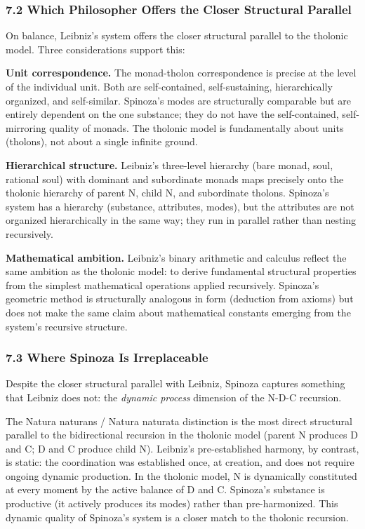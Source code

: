 \documentclass[
  11pt,
  letterpaper,
]{article}
\begin{document}
\subsubsection{7.2 Which Philosopher Offers the Closer Structural
Parallel}\label{which-philosopher-offers-the-closer-structural-parallel}

On balance, Leibniz's system offers the closer structural parallel to
the tholonic model. Three considerations support this:

\textbf{Unit correspondence.} The monad-tholon correspondence is precise
at the level of the individual unit. Both are self-contained,
self-sustaining, hierarchically organized, and self-similar. Spinoza's
modes are structurally comparable but are entirely dependent on the one
substance; they do not have the self-contained, self-mirroring quality
of monads. The tholonic model is fundamentally about units (tholons),
not about a single infinite ground.

\textbf{Hierarchical structure.} Leibniz's three-level hierarchy (bare
monad, soul, rational soul) with dominant and subordinate monads maps
precisely onto the tholonic hierarchy of parent N, child N, and
subordinate tholons. Spinoza's system has a hierarchy (substance,
attributes, modes), but the attributes are not organized hierarchically
in the same way; they run in parallel rather than nesting recursively.

\textbf{Mathematical ambition.} Leibniz's binary arithmetic and calculus
reflect the same ambition as the tholonic model: to derive fundamental
structural properties from the simplest mathematical operations applied
recursively. Spinoza's geometric method is structurally analogous in
form (deduction from axioms) but does not make the same claim about
mathematical constants emerging from the system's recursive structure.

\subsubsection{7.3 Where Spinoza Is
Irreplaceable}\label{where-spinoza-is-irreplaceable}

Despite the closer structural parallel with Leibniz, Spinoza captures
something that Leibniz does not: the \emph{dynamic process} dimension of
the N-D-C recursion.

The Natura naturans / Natura naturata distinction is the most direct
structural parallel to the bidirectional recursion in the tholonic model
(parent N produces D and C; D and C produce child N). Leibniz's
pre-established harmony, by contrast, is static: the coordination was
established once, at creation, and does not require ongoing dynamic
production. In the tholonic model, N is dynamically constituted at every
moment by the active balance of D and C. Spinoza's substance is
productive (it actively produces its modes) rather than pre-harmonized.
This dynamic quality of Spinoza's system is a closer match to the
tholonic recursion.
\end{document}
